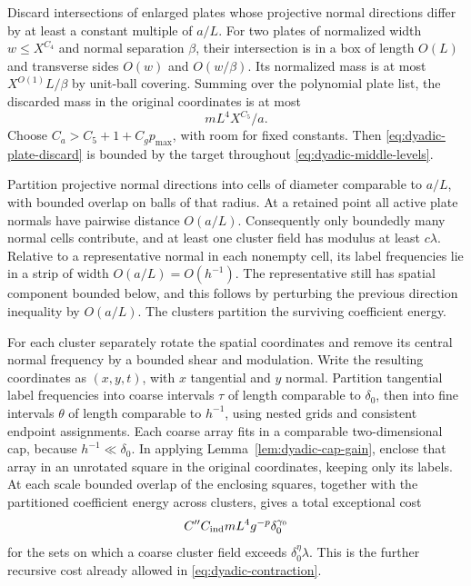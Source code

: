 Discard intersections of enlarged plates whose projective normal
directions differ by at least a constant multiple of $a/L$.  For two
plates of normalized width $w\leq X^{C_4}$ and normal separation
$\beta$, their intersection is in a box of length $O(L)$ and transverse
sides $O(w)$ and $O(w/\beta)$.  Its normalized mass is at most
$X^{O(1)}L/\beta$ by unit-ball covering.  Summing over the polynomial
plate list, the discarded mass in the original coordinates is at most
\begin{equation}\label{eq:dyadic-plate-discard}
 mL^4X^{C_5}/a.
\end{equation}
Choose $C_a>C_5+1+C_gp_{\max}$, with room for fixed constants.  Then
\eqref{eq:dyadic-plate-discard} is bounded by the target throughout
\eqref{eq:dyadic-middle-levels}.

Partition projective normal directions into cells of diameter comparable
to $a/L$, with bounded overlap on balls of that radius.  At a retained
point all active plate normals have pairwise distance $O(a/L)$.
Consequently only boundedly many normal cells contribute, and at least
one cluster field has modulus at least $c\lambda$.  Relative to a
representative normal in each nonempty cell, its label frequencies lie
in a strip of width $O(a/L)=O(h^{-1})$.  The representative still has
spatial component bounded below, and this follows by perturbing the
previous direction inequality by $O(a/L)$.  The clusters partition the
surviving coefficient energy.

For each cluster separately rotate the spatial coordinates and remove
its central normal frequency by a bounded shear and modulation.
Write the resulting coordinates as $(x,y,t)$, with $x$ tangential and
$y$ normal.  Partition tangential label frequencies into coarse
intervals $\tau$ of length comparable to $\delta_0$, then into fine
intervals $\theta$ of length comparable to $h^{-1}$, using nested grids
and consistent endpoint assignments.  Each coarse array fits in a
comparable two-dimensional cap, because $h^{-1}\ll\delta_0$.
In applying Lemma~\ref{lem:dyadic-cap-gain}, enclose that array in an
unrotated square in the original coordinates, keeping only its labels.
At each scale bounded overlap of the enclosing squares, together with
the partitioned coefficient energy across clusters, gives a total
exceptional cost
\[
 C''C_{\rm ind}mL^4g^{-p}\delta_0^{\gamma_0}
\]
for the sets on which a coarse cluster field exceeds
$\delta_0^\eta\lambda$.  This is the further recursive cost already
allowed in \eqref{eq:dyadic-contraction}.

